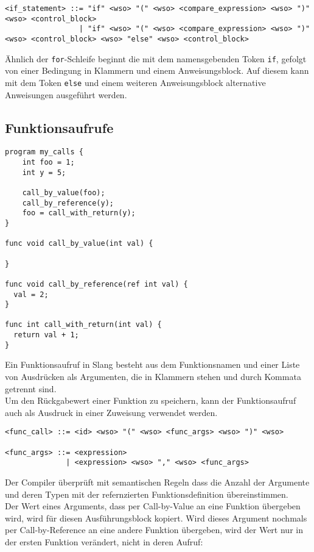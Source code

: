 \begin{lstlisting}[caption={Grammatikdefinition if-Bedingung}]
<if_statement> ::= "if" <wso> "(" <wso> <compare_expression> <wso> ")" <wso> <control_block>
                 | "if" <wso> "(" <wso> <compare_expression> <wso> ")"  <wso> <control_block> <wso> "else" <wso> <control_block>
\end{lstlisting}

Ähnlich der \texttt{for}-Schleife beginnt die mit dem namensgebenden Token \texttt{if}, gefolgt von einer Bedingung in Klammern und einem Anweisungsblock.
Auf diesem kann mit dem Token \texttt{else} und einem weiteren Anweisungsblock alternative Anweisungen ausgeführt werden.

\pagebreak

\subsection{Funktionsaufrufe}

\begin{lstlisting}[caption={Slang Beispiel Funktionsaufrufe}]
program my_calls {
    int foo = 1;
    int y = 5;
    
    call_by_value(foo);
    call_by_reference(y);
    foo = call_with_return(y);
}

func void call_by_value(int val) {
  
}

func void call_by_reference(ref int val) {
  val = 2;
}

func int call_with_return(int val) {
  return val + 1;
}
\end{lstlisting}

Ein Funktionsaufruf in Slang besteht aus dem Funktionsnamen und einer Liste von Ausdrücken als Argumenten, die in Klammern stehen und durch Kommata getrennt sind.\\
Um den Rückgabewert einer Funktion zu speichern, kann der Funktionsaufruf auch als Ausdruck in einer Zuweisung verwendet werden.

\begin{lstlisting}[caption={Grammatikdefinition Funktionsaufrufe}]
<func_call> ::= <id> <wso> "(" <wso> <func_args> <wso> ")" <wso>

<func_args> ::= <expression>
              | <expression> <wso> "," <wso> <func_args>
\end{lstlisting}

Der Compiler überprüft mit semantischen Regeln dass die Anzahl der Argumente und deren Typen mit der refernzierten Funktionsdefinition übereinstimmen.\\
Der Wert eines Arguments, dass per Call-by-Value an eine Funktion übergeben wird, wird für diesen Ausführungsblock kopiert.
Wird dieses Argument nochmals per Call-by-Reference an eine andere Funktion übergeben, wird der Wert nur in der ersten Funktion verändert, nicht in deren Aufruf:

